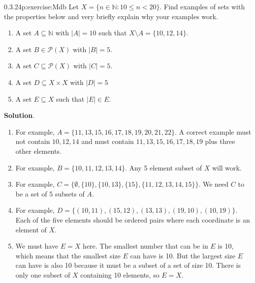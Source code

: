 \documentclass[twoside,11pt,]{book}
\newcommand{\blocktitlefont}{\relax}
\numberwithin{equation}{chapter}
\newcommand{\N}{\mathbb N}
\newcommand{\pow}{\mathcal P}
\newcommand{\st}{:}
\newcommand{\lt}{<}
\begin{document}
\begin{divisionsolution}{0.3.24}{}{p:exercise:Mdb}%
Let \(X = \{n \in \N \st 10 \le n \lt 20\}\). Find examples of sets with the properties below and very briefly explain why your examples work.%
\begin{enumerate}[label=(\alph*)]
\item{}A set \(A \subseteq \N\) with \(|A| = 10\) such that \(X \setminus A = \{10, 12, 14\}\).%
\item{}A set \(B \in \pow(X)\) with \(|B| = 5\).%
\item{}A set \(C \subseteq \pow(X)\) with \(|C| = 5\).%
\item{}A set \(D \subseteq X \times X\) with \(|D| = 5\)%
\item{}A set \(E \subseteq X\) such that \(|E| \in E\).%
\end{enumerate}
%
\par\smallskip%
\noindent\textbf{\blocktitlefont Solution}.\quad{}%
\begin{enumerate}[label=(\alph*)]
\item{}For example, \(A = \{11, 13, 15, 16, 17, 18, 19, 20, 21, 22\}\). A correct example must not contain \(10, 12, 14\) and must contain \(11, 13, 15, 16, 17, 18, 19\) plus three other elements.%
\item{}For example, \(B = \{10, 11, 12, 13, 14\}\). Any 5 element subset of \(X\) will work.%
\item{}For example, \(C = \{\emptyset, \{10\}, \{10, 13\}, \{15\}, \{11, 12, 13, 14, 15\}\}\). We need \(C\) to be a set of 5 subsets of \(A\).%
\item{}For example, \(D = \{(10,11), (15,12), (13,13), (19,10), (10,19)\}\). Each of the five elements should be ordered pairs where each coordinate is an element of \(X\).%
\item{}We must have \(E = X\) here. The smallest number that can be in \(E\) is 10, which means that the smallest size \(E\) can have is 10. But the largest size \(E\) can have is also 10 because it must be a subset of a set of size 10. There is only one subset of \(X\) containing 10 elements, so \(E = X\).%
\end{enumerate}
%
\end{divisionsolution}%
\end{document}

